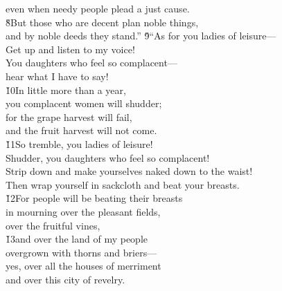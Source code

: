 \begin{poetry}
\poemll    even when needy people plead a just cause. \\
\poeml \v{8}But those who are decent plan noble things, \\
\poemll    and by noble deeds they stand.''
\poeml \v{9}``As for you ladies of leisure--- \\
\poemll    Get up and listen to my voice! \\
\poeml You daughters who feel so complacent--- \\
\poemll    hear what I have to say! \\
\poeml \v{10}In little more than a year, \\
\poemll    you complacent women will shudder; \\
\poeml for the grape harvest will fail, \\
\poemll    and the fruit harvest will not come. \\
\poeml \v{11}So tremble, you ladies of leisure! \\
\poemll    Shudder, you daughters who feel so complacent! \\
\poeml Strip down and make yourselves naked down to the waist! \\
\poemll    Then wrap yourself in sackcloth and beat your breasts. \\
\poeml \v{12}For people will be beating their breasts \\
\poemll    in mourning over the pleasant fields, \\
\poemlll       over the fruitful vines, \\
\poeml \v{13}and over the land of my people \\
\poemll    overgrown with thorns and briers--- \\
\poeml yes, over all the houses of merriment \\
\poemll    and over this city of revelry. \\

\end{poetry}
